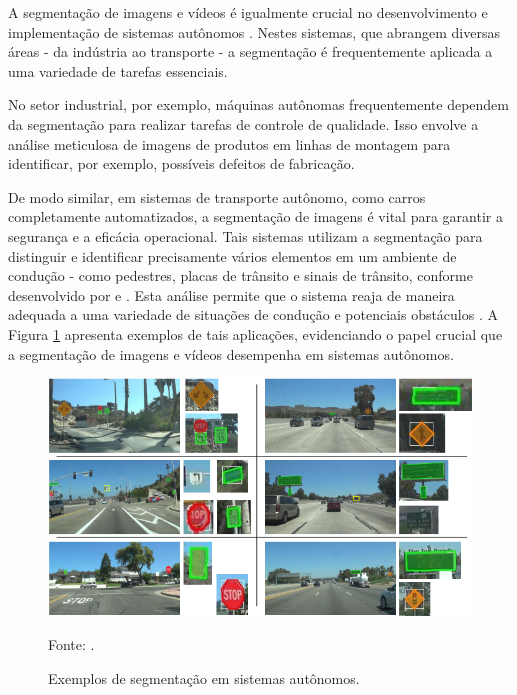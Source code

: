 A segmentação de imagens e vídeos é igualmente crucial no desenvolvimento e implementação de sistemas autônomos \citep{Kaymak2019, Liu2020, Pan2020, Teichmann2018}. Nestes sistemas, que abrangem diversas áreas - da indústria ao transporte - a segmentação é frequentemente aplicada a uma variedade de tarefas essenciais.

No setor industrial, por exemplo, máquinas autônomas frequentemente dependem da segmentação para realizar tarefas de controle de qualidade. Isso envolve a análise meticulosa de imagens de produtos em linhas de montagem para identificar, por exemplo, possíveis defeitos de fabricação.

De modo similar, em sistemas de transporte autônomo, como carros completamente automatizados, a segmentação de imagens é vital para garantir a segurança e a eficácia operacional. Tais sistemas utilizam a segmentação para distinguir e identificar precisamente vários elementos em um ambiente de condução - como pedestres, placas de trânsito e sinais de trânsito, conforme desenvolvido por \cite{Lee2018} e \cite{Fleyeh2004}. Esta análise permite que o sistema reaja de maneira adequada a uma variedade de situações de condução e potenciais obstáculos \citep{Lee2018, Fleyeh2004, Pan2020}. A Figura \ref{intro:fig:2} apresenta exemplos de tais aplicações, evidenciando o papel crucial que a segmentação de imagens e vídeos desempenha em sistemas autônomos.

\begin{figure}[H]
    \centering
    \caption{Exemplos de segmentação em sistemas autônomos.}
    \includegraphics[width=1\linewidth]{recursos/imagens/introduction/placas.png}
    \label{intro:fig:2}

    Fonte: \cite{Lee2018}.
\end{figure}

